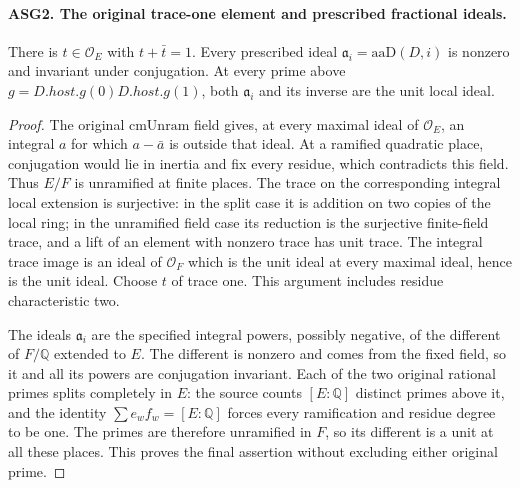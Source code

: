 \documentclass[11pt,a4paper]{article}
\numberwithin{equation}{section}
\theoremstyle{remark}\newtheorem{remark}[theorem]{Remark}
\begin{document}
\paragraph{ASG2. The original trace-one element and prescribed fractional ideals.}
\label{claim:ASG2}
There is \(t\in\mathcal O_E\) with \(t+\bar t=1\).
Every prescribed ideal
\(\mathfrak a_i=\mathrm{aaD}(D,i)\) is nonzero and invariant
under conjugation.  At every prime above
\(g=D.host.g(0)D.host.g(1)\), both \(\mathfrak a_i\) and its
inverse are the unit local ideal.
\begin{proof}
The original \(\mathrm{cmUnram}\) field gives, at every maximal
ideal of \(\mathcal O_E\), an integral \(a\) for which
\(a-\bar a\) is outside that ideal.  At a ramified quadratic
place, conjugation would lie in inertia and fix every residue, which
contradicts this field.  Thus \(E/F\) is unramified at finite
places.  The trace on the corresponding integral local extension is
surjective: in the split case it is addition on two copies of the local
ring; in the unramified field case its reduction is the surjective
finite-field trace, and a lift of an element with nonzero trace has
unit trace.  The integral trace image is an ideal of \(\mathcal O_F\)
which is the unit ideal at every maximal ideal, hence is the unit ideal.
Choose \(t\) of trace one.  This argument includes residue
characteristic two.

The ideals \(\mathfrak a_i\) are the specified integral powers,
possibly negative, of the different of \(F/\mathbb Q\) extended
to \(E\).  The different is nonzero and comes from the fixed
field, so it and all its powers are conjugation invariant.
Each of the two original rational primes splits completely in \(E\):
the source counts \([E:\mathbb Q]\) distinct primes above it,
and the identity \(\sum e_w f_w=[E:\mathbb Q]\) forces every
ramification and residue degree to be one.  The primes are therefore
unramified in \(F\), so its different is a unit at all these
places.  This proves the final assertion without excluding either
original prime.
\end{proof}

\end{document}
